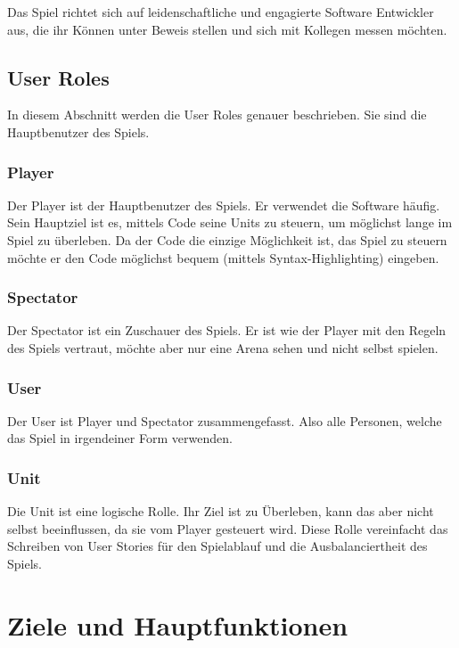 \documentclass[11pt,a4paper,german]{scrartcl}
\let\oldsection\section
\renewcommand\section{\clearpage\oldsection}
\begin{document}
Das Spiel richtet sich auf leidenschaftliche und engagierte Software Entwickler aus, die ihr Können unter Beweis stellen und sich mit Kollegen messen möchten.

\subsection{User Roles}
In diesem Abschnitt werden die User Roles genauer beschrieben. Sie sind die Hauptbenutzer des Spiels.
\subsubsection{Player}
Der Player ist der Hauptbenutzer des Spiels. Er verwendet die Software häufig. Sein Hauptziel ist es, mittels Code seine Units zu steuern, um möglichst lange im Spiel zu überleben. Da der Code die einzige Möglichkeit ist, das Spiel zu steuern möchte er den Code möglichst bequem (mittels Syntax-Highlighting) eingeben.
\subsubsection{Spectator}
Der Spectator ist ein Zuschauer des Spiels. Er ist wie der Player mit den Regeln des Spiels vertraut, möchte aber nur eine Arena sehen und nicht selbst spielen.
\subsubsection{User}
Der User ist Player und Spectator zusammengefasst. Also alle Personen, welche das Spiel in irgendeiner Form verwenden.
\subsubsection{Unit}
Die Unit ist eine logische Rolle. Ihr Ziel ist zu Überleben, kann das aber nicht selbst beeinflussen, da sie vom Player gesteuert wird. Diese Rolle vereinfacht das Schreiben von User Stories für den Spielablauf und die Ausbalanciertheit des Spiels.

\section{Ziele und Hauptfunktionen}
\end{document}
